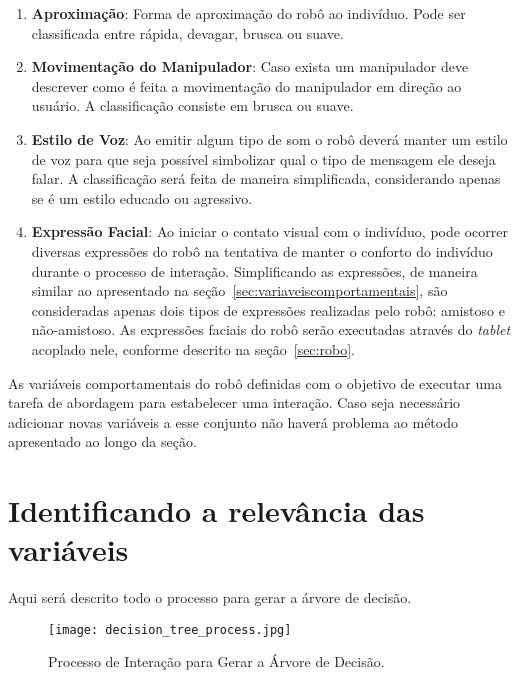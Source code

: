 \begin{enumerate}
	\item \textbf{Aproximação}: Forma de aproximação do robô ao indivíduo. Pode ser classificada entre rápida, devagar, brusca ou suave.
	\item \textbf{Movimentação do Manipulador}: Caso exista um manipulador deve descrever como é feita a movimentação do manipulador em direção ao usuário. A classificação consiste em brusca ou suave.
	\item \textbf{Estilo de Voz}: Ao emitir algum tipo de som o robô deverá manter um estilo de voz para que seja possível simbolizar qual o tipo de mensagem ele deseja falar. A classificação será feita de maneira simplificada, considerando apenas se é um estilo educado ou agressivo.
	\item \textbf{Expressão Facial}: Ao iniciar o contato visual com o indivíduo, pode ocorrer diversas expressões do robô na tentativa de manter o conforto do indivíduo durante o processo de interação. Simplificando as expressões, de maneira similar ao apresentado na seção~\ref{sec:variaveiscomportamentais}, são consideradas apenas dois tipos de expressões realizadas pelo robô: amistoso e não-amistoso. As expressões faciais do robô serão executadas através do \emph{tablet} acoplado nele, conforme descrito na seção~\ref{sec:robo}.
\end{enumerate}

As variáveis comportamentais do robô definidas com o objetivo de executar uma tarefa de abordagem para estabelecer uma interação. Caso seja necessário adicionar novas variáveis a esse conjunto não haverá problema ao método apresentado ao longo da seção.

\section{Identificando a relevância das variáveis}
\label{sec:decisiontree}

Aqui será descrito todo o processo para gerar a árvore de decisão.

\begin{figure}[ht!]
	\centering
	\texttt{[image: decision\_tree\_process.jpg]}
	\caption{Processo de Interação para Gerar a Árvore de Decisão.}
	\label{fig:rbc}
\end{figure}
